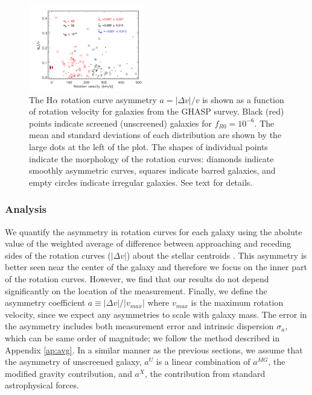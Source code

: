 \documentclass[twocolappendix, numberedappendix]{emulateapj}
\newcommand{\ha}{H$\alpha$}
\begin{document}
\begin{figure}
\begin{center}
\includegraphics[trim= 3cm 0cm 0cm 0cm, clip = true, width=0.45\textwidth]
{figures/GHASP2.png}
\caption{The  \ha{} rotation curve asymmetry $a=|\Delta v|/v$ is shown as a
function of rotation velocity for  galaxies from the GHASP survey. Black (red) points
indicate screened (unscreened) galaxies for $f_{R0}=10^{-6}$.
The mean and standard deviations of each distribution are shown by the large
dots at the left of the plot. The shapes of individual points indicate the 
morphology of the rotation curves: diamonds indicate smoothly asymmetric
curves, squares indicate barred galaxies, and empty circles indicate irregular
galaxies.  See  text for details.
\label{fig:plotsGHASP}}
\end{center}
\end{figure}


\subsubsection{Analysis}
We quantify the asymmetry in rotation curves for each galaxy
using the abolute value of the weighted average of difference between
approaching and receding sides of the rotation curves ($|\Delta v|$) about the
stellar centroids \citep{epinat08a}. This asymmetry is better seen near the
center of the galaxy and therefore we focus on the inner part of the
rotation curves. However, we find that our results do not depend
significantly on the location of the measurement. Finally, we define the
asymmetry coefficient $a \equiv |\Delta v| / |v_{max}|$ where $v_{max}$ is the
maximum rotation velocity, since we expect any asymmetries to scale with
galaxy mass.
The error in the asymmetry
includes both measurement error and intrinsic dispersion $\sigma_a$, which
can be same order of magnitude; we follow the method described in Appendix
\ref{ap:avg}. In a similar manner as the previous sections, we assume that
the asymmetry of unscreened galaxy, $a^U$ is a linear combination of
$a^{MG}$, the modified gravity contribution, and $a^X$, the contribution from
standard astrophysical forces.
\end{document}
